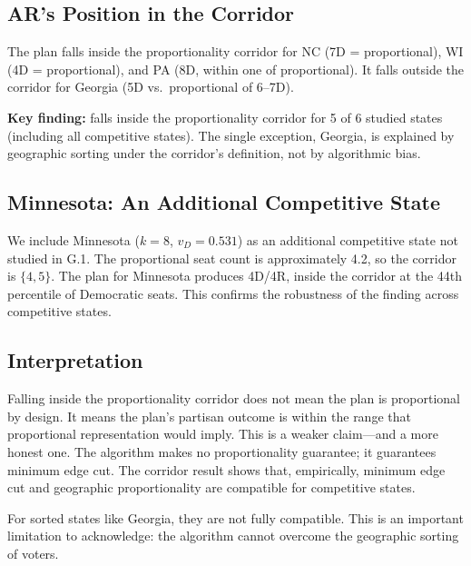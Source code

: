 \subsection{AR's Position in the Corridor}

The \ar{} plan falls inside the proportionality corridor for NC (7D = proportional),
WI (4D = proportional), and PA (8D, within one of proportional).  It falls
outside the corridor for Georgia (5D vs.\ proportional of 6--7D).

\begin{keybox}
\textbf{Key finding:} \ar{} falls inside the proportionality corridor for
5 of 6 studied states (including all competitive states).  The single
exception, Georgia, is explained by geographic sorting under the corridor's
definition, not by algorithmic bias.
\end{keybox}

\subsection{Minnesota: An Additional Competitive State}

We include Minnesota ($k = 8$, $v_D = 0.531$) as an additional competitive
state not studied in G.1.  The proportional seat count is approximately 4.2,
so the corridor is $\{4, 5\}$.  The \ar{} plan for Minnesota produces 4D/4R,
inside the corridor at the 44th percentile of Democratic seats.  This
confirms the robustness of the finding across competitive states.

\subsection{Interpretation}

Falling inside the proportionality corridor does not mean the plan is
proportional by design.  It means the plan's partisan outcome is within
the range that proportional representation would imply.  This is a weaker
claim---and a more honest one.  The \ar{} algorithm makes no proportionality
guarantee; it guarantees minimum edge cut.  The corridor result shows that,
empirically, minimum edge cut and geographic proportionality are compatible
for competitive states.

For sorted states like Georgia, they are not fully compatible.  This is an
important limitation to acknowledge: the \ar{} algorithm cannot overcome
the geographic sorting of voters.
